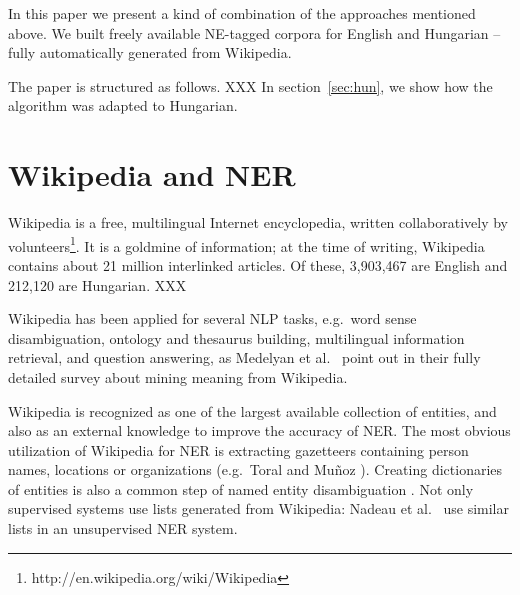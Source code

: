 \documentclass[11pt]{article}
\begin{document}


In this paper we present a kind of combination of the approaches mentioned above. We built freely available NE-tagged corpora for English and Hungarian -- fully automatically generated from Wikipedia. %

The paper is structured as follows. XXX In section~\ref{sec:hun}, we show how the algorithm was adapted to Hungarian.


\section{Wikipedia and NER}
\label{sec:related}

Wikipedia is a free, multilingual Internet encyclopedia, written collaboratively by volunteers\footnote{http://en.wikipedia.org/wiki/Wikipedia}. It is a goldmine of information; at the time of writing, Wikipedia contains about 21 million interlinked articles. Of these, 3,903,467 are English and 212,120 are Hungarian. XXX %

Wikipedia has been applied for several NLP tasks, e.g.~word sense disambiguation, ontology and thesaurus building, multilingual information retrieval, and question answering, as Medelyan et al.~ point out in their fully detailed survey about mining meaning from Wikipedia. 

Wikipedia is recognized as one of the largest available collection of entities, and also as an external knowledge to improve the accuracy of NER. The most obvious utilization of Wikipedia for NER is extracting gazetteers containing person names, locations or organizations (e.g.~Toral and Mu\~noz ). Creating dictionaries of entities is also a common step of named entity disambiguation \cite{Bunescu:06,Cucerzan:07}. Not only supervised systems use lists generated from Wikipedia: Nadeau et al.~ use similar lists in an unsupervised NER system. 
\end{document}
